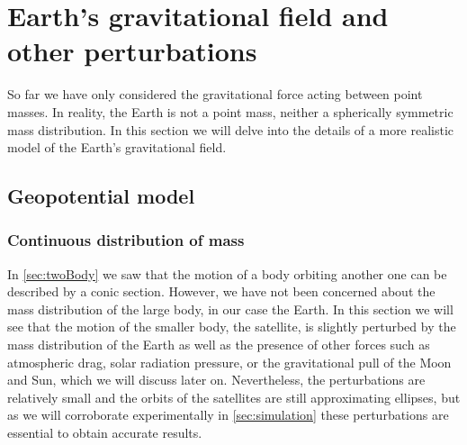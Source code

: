 \documentclass[../main.tex]{subfiles}
\begin{document}
\section{Earth's gravitational field and other perturbations}\label{sec:force}
So far we have only considered the gravitational force acting between point masses. In reality, the Earth is not a point mass, neither a spherically symmetric mass distribution. In this section we will delve into the details of a more realistic model of the Earth's gravitational field.
\subsection{Geopotential model}
\subsubsection{Continuous distribution of mass}
In \cref{sec:twoBody} we saw that the motion of a body orbiting another one can be described by a conic section. However, we have not been concerned about the mass distribution of the large body, in our case the Earth. In this section we will see that the motion of the smaller body, the satellite, is slightly perturbed by the mass distribution of the Earth as well as the presence of other forces such as atmospheric drag, solar radiation pressure, or the gravitational pull of the Moon and Sun, which we will discuss later on. Nevertheless, the perturbations are relatively small and the orbits of the satellites are still approximating ellipses, but as we will corroborate experimentally in \cref{sec:simulation} these perturbations are essential to obtain accurate results.
\end{document}
